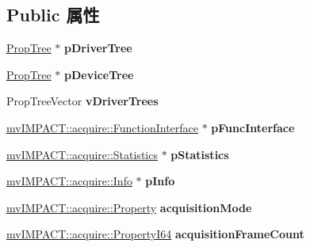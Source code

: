 \subsection*{Public 属性}
\begin{DoxyCompactItemize}
\item 
\hypertarget{struct_device_data_aabee7a5e5c8f7aec6bdcb21a70946b33}{\hyperlink{class_prop_tree}{Prop\+Tree} $\ast$ {\bfseries p\+Driver\+Tree}}\label{struct_device_data_aabee7a5e5c8f7aec6bdcb21a70946b33}

\item 
\hypertarget{struct_device_data_a3dd7de13f028d624b5cbc36f5dce68fd}{\hyperlink{class_prop_tree}{Prop\+Tree} $\ast$ {\bfseries p\+Device\+Tree}}\label{struct_device_data_a3dd7de13f028d624b5cbc36f5dce68fd}

\item 
\hypertarget{struct_device_data_a005d8cc9fd50c866b677892af9476efe}{Prop\+Tree\+Vector {\bfseries v\+Driver\+Trees}}\label{struct_device_data_a005d8cc9fd50c866b677892af9476efe}

\item 
\hypertarget{struct_device_data_a963c20f53f46e9bdfc66b56cd903d735}{\hyperlink{classmv_i_m_p_a_c_t_1_1acquire_1_1_function_interface}{mv\+I\+M\+P\+A\+C\+T\+::acquire\+::\+Function\+Interface} $\ast$ {\bfseries p\+Func\+Interface}}\label{struct_device_data_a963c20f53f46e9bdfc66b56cd903d735}

\item 
\hypertarget{struct_device_data_a42270c20c7d53fba8bdefc4a29ba02d3}{\hyperlink{classmv_i_m_p_a_c_t_1_1acquire_1_1_statistics}{mv\+I\+M\+P\+A\+C\+T\+::acquire\+::\+Statistics} $\ast$ {\bfseries p\+Statistics}}\label{struct_device_data_a42270c20c7d53fba8bdefc4a29ba02d3}

\item 
\hypertarget{struct_device_data_ac58c4937bdae6e91e6be3995bc3e9369}{\hyperlink{classmv_i_m_p_a_c_t_1_1acquire_1_1_info}{mv\+I\+M\+P\+A\+C\+T\+::acquire\+::\+Info} $\ast$ {\bfseries p\+Info}}\label{struct_device_data_ac58c4937bdae6e91e6be3995bc3e9369}

\item 
\hypertarget{struct_device_data_a46e9d944c556eba6ede47fe894cf1e42}{\hyperlink{classmv_i_m_p_a_c_t_1_1acquire_1_1_property}{mv\+I\+M\+P\+A\+C\+T\+::acquire\+::\+Property} {\bfseries acquisition\+Mode}}\label{struct_device_data_a46e9d944c556eba6ede47fe894cf1e42}

\item 
\hypertarget{struct_device_data_ad02f35dd076beb38b5401bb588a8c9e9}{\hyperlink{group___common_interface_ga81749b2696755513663492664a18a893}{mv\+I\+M\+P\+A\+C\+T\+::acquire\+::\+Property\+I64} {\bfseries acquisition\+Frame\+Count}}\label{struct_device_data_ad02f35dd076beb38b5401bb588a8c9e9}


\end{DoxyCompactItemize}
